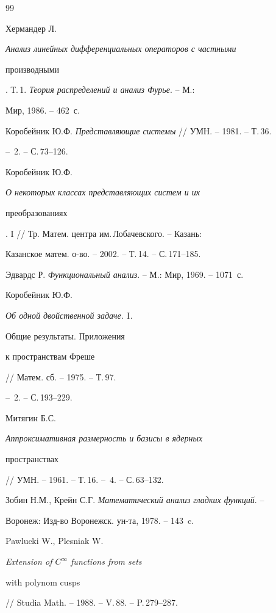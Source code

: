 \begin{thebibliography}{99}







Хермандер Л. {\em Анализ линейных дифференциальных операторов с частными


производными}. Т.\,1. {\em Теория распределений и анализ Фурье}. -- М.:


Мир, 1986. -- 462~с.




Коробейник Ю.Ф. {\em Представляющие системы} // УМН. -- 1981. -- Т.\,36. 


-- \No\,2. -- С.\,73--126.




Коробейник Ю.Ф. {\em О некоторых классах представляющих систем и их


преобразованиях}. I // Тр. Матем. центра им.\,Лобачевского. -- Казань:


Казанское матем. о-во. -- 2002. -- Т.\,14. -- С.\,171--185.




Эдвардс Р. {\em Функциональный анализ}. -- М.: Мир, 1969. -- 1071~с.




Коробейник Ю.Ф. {\em Об одной двойственной задаче. $\mathrm I$.


Общие результаты. Приложения


к пространствам Фреше} // Матем. сб. -- 1975. -- Т.\,97.


-- \No\,2. -- С.\,193--229.




Митягин Б.С. {\em Аппроксимативная размерность и базисы в ядерных


пространствах}


// УМН. -- 1961. -- Т.\,16. -- \No\,4. -- С.\,63--132.




Зобин Н.М., Крейн С.Г. {\em Математический анализ гладких функций}. --


Воронеж: Изд-во Воронежск. ун-та, 1978. -- 143~c.




Pawlucki W., Plesniak W. {\em Extension of $C^{\infty}$ functions from sets


with polynom cusps} // Studia Math. -- 1988. -- V.\,88. -- P.\,279--287.





\end{thebibliography}
